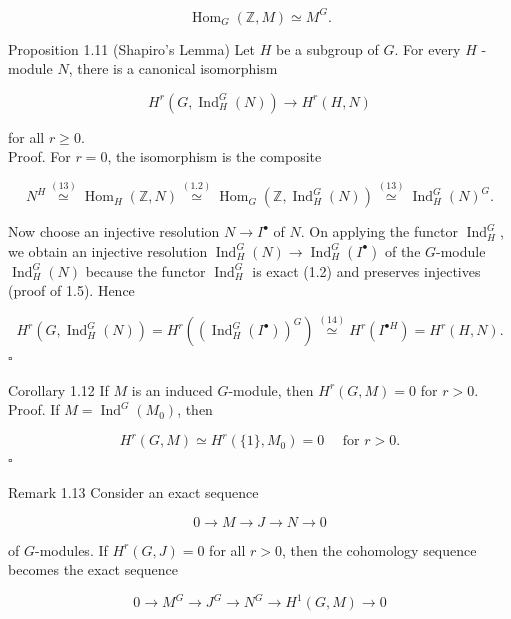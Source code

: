 \documentclass[10pt]{article}
\begin{document}
\begin{equation*}
\operatorname{Hom}_{G}(\mathbb{Z}, M) \simeq M^{G} . \tag{13}
\end{equation*}


Proposition 1.11 (Shapiro's Lemma) Let $H$ be a subgroup of $G$. For every $H$ -module $N$, there is a canonical isomorphism

$$
H^{r}\left(G, \operatorname{Ind}_{H}^{G}(N)\right) \rightarrow H^{r}(H, N)
$$

for all $r \geq 0$.\\
Proof. For $r=0$, the isomorphism is the composite


\begin{equation*}
N^{H} \stackrel{(13)}{\simeq} \operatorname{Hom}_{H}(\mathbb{Z}, N) \stackrel{(1.2)}{\simeq} \operatorname{Hom}_{G}\left(\mathbb{Z}, \operatorname{Ind}_{H}^{G}(N)\right) \stackrel{(13)}{\simeq} \operatorname{Ind}_{H}^{G}(N)^{G} . \tag{14}
\end{equation*}


Now choose an injective resolution $N \rightarrow I^{\bullet}$ of $N$. On applying the functor $\operatorname{Ind}_{H}^{G}$, we obtain an injective resolution $\operatorname{Ind}_{H}^{G}(N) \rightarrow \operatorname{Ind}_{H}^{G}\left(I^{\bullet}\right)$ of the $G$-module $\operatorname{Ind}_{H}^{G}(N)$ because the functor $\operatorname{Ind}_{H}^{G}$ is exact (1.2) and preserves injectives (proof of 1.5). Hence

$$
H^{r}\left(G, \operatorname{Ind}_{H}^{G}(N)\right)=H^{r}\left(\left(\operatorname{Ind}_{H}^{G}\left(I^{\bullet}\right)\right)^{G}\right) \stackrel{(14)}{\simeq} H^{r}\left(I^{\bullet H}\right)=H^{r}(H, N) .
$$ \(\square\)

Corollary 1.12 If $M$ is an induced $G$-module, then $H^{r}(G, M)=0$ for $r>0$.\\
Proof. If $M=\operatorname{Ind}^{G}\left(M_{0}\right)$, then

$$
H^{r}(G, M) \simeq H^{r}\left(\{1\}, M_{0}\right)=0 \quad \text { for } r>0 .
$$ \(\square\)

Remark 1.13 Consider an exact sequence

$$
0 \rightarrow M \rightarrow J \rightarrow N \rightarrow 0
$$

of $G$-modules. If $H^{r}(G, J)=0$ for all $r>0$, then the cohomology sequence becomes the exact sequence

$$
0 \rightarrow M^{G} \rightarrow J^{G} \rightarrow N^{G} \rightarrow H^{1}(G, M) \rightarrow 0
$$
\end{document}
